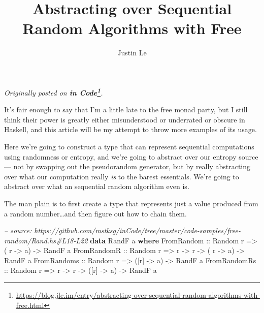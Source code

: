 \documentclass[]{article}
\title{Abstracting over Sequential Random Algorithms with Free}
\author{Justin Le}
\newenvironment{Shaded}{}{}
\newcommand{\KeywordTok}[1]{\textcolor[rgb]{0.00,0.44,0.13}{\textbf{#1}}}
\newcommand{\DataTypeTok}[1]{\textcolor[rgb]{0.56,0.13,0.00}{#1}}
\newcommand{\CommentTok}[1]{\textcolor[rgb]{0.38,0.63,0.69}{\textit{#1}}}
\newcommand{\OtherTok}[1]{\textcolor[rgb]{0.00,0.44,0.13}{#1}}
\newcommand{\NormalTok}[1]{#1}
\renewcommand{\href}[2]{#2\footnote{\url{#1}}}
\begin{document}
\maketitle

\emph{Originally posted on
\textbf{\href{https://blog.jle.im/entry/abstracting-over-sequential-random-algorithms-with-free.html}{in
Code}}.}

It's fair enough to say that I'm a little late to the free monad party, but I
still think their power is greatly either misunderstood or underrated or obscure
in Haskell, and this article will be my attempt to throw more examples of its
usage.

Here we're going to construct a type that can represent sequential computations
using randomness or entropy, and we're going to abstract over our entropy source
--- not by swapping out the pseudorandom generator, but by really abstracting
over what our computation really \emph{is} to the barest essentials. We're going
to abstract over what an sequential random algorithm even is.

The man plain is to first create a type that represents just a value produced
from a random number\ldots{}and then figure out how to chain them.

\begin{Shaded}
\begin{Highlighting}[]
\CommentTok{-- source: https://github.com/mstksg/inCode/tree/master/code-samples/free-random/Rand.hs#L18-L22}
\KeywordTok{data} \DataTypeTok{RandF}\NormalTok{ a }\KeywordTok{where}
    \DataTypeTok{FromRandom}\OtherTok{   ::} \DataTypeTok{Random}\NormalTok{ r }\OtherTok{=>}\NormalTok{           ( r  }\OtherTok{->}\NormalTok{ a) }\OtherTok{->} \DataTypeTok{RandF}\NormalTok{ a}
    \DataTypeTok{FromRandomR}\OtherTok{  ::} \DataTypeTok{Random}\NormalTok{ r }\OtherTok{=>}\NormalTok{ r }\OtherTok{->}\NormalTok{ r }\OtherTok{->}\NormalTok{ ( r  }\OtherTok{->}\NormalTok{ a) }\OtherTok{->} \DataTypeTok{RandF}\NormalTok{ a}
    \DataTypeTok{FromRandoms}\OtherTok{  ::} \DataTypeTok{Random}\NormalTok{ r }\OtherTok{=>}\NormalTok{           ([r] }\OtherTok{->}\NormalTok{ a) }\OtherTok{->} \DataTypeTok{RandF}\NormalTok{ a}
    \DataTypeTok{FromRandomRs}\OtherTok{ ::} \DataTypeTok{Random}\NormalTok{ r }\OtherTok{=>}\NormalTok{ r }\OtherTok{->}\NormalTok{ r }\OtherTok{->}\NormalTok{ ([r] }\OtherTok{->}\NormalTok{ a) }\OtherTok{->} \DataTypeTok{RandF}\NormalTok{ a}
\end{Highlighting}
\end{Shaded}
\end{document}
